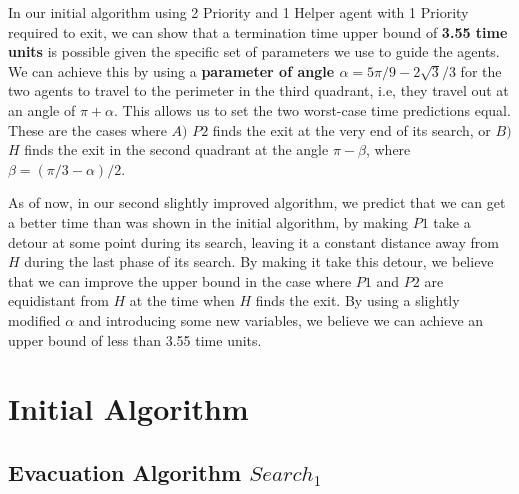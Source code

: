 \documentclass[11pt]{article}
\begin{document}
\begin{flushleft}
\hspace{\parindent} In our initial algorithm using 2 Priority and 1 Helper agent with 1 Priority required to exit, we can show that a termination time
upper bound of \textbf{3.55 time units} is possible given the specific set of parameters we use
to guide the agents. We can achieve this by using a \textbf{parameter of angle $\alpha = 5 \pi / 9 - 2\sqrt3 /3$} for the two agents to travel to the perimeter in the third quadrant, i.e, they travel out at
an angle of \textbf{$\pi + \alpha$}. This allows us to set the two worst-case time predictions equal.
These are the cases where \textbf{$A)$} $P2$ finds the exit at the very end of its search,
or \textbf{$B)$} $H$ finds the exit in the second quadrant at the angle \textbf{$\pi - \beta$},
where \textbf{$\beta = ( \pi / 3 - \alpha) / 2$}.

\hspace{\parindent} As of now, in our second slightly improved algorithm, we predict that we can get a
better time than was shown in the initial algorithm, by making $P1$ take a detour at some point during its
search, leaving it a constant distance away from $H$ during the last phase of its search. By making it
take this detour, we believe that we can improve the upper bound in the case where $P1$ and $P2$ are
equidistant from $H$ at the time when $H$ finds the exit. By using a slightly modified $\alpha$ and introducing some new variables, we believe we can achieve an upper bound of less than 3.55 time units.
\end{flushleft}




\section{Initial Algorithm}

\subsection {Evacuation Algorithm \textbf{$Search_{1}$}}
\end{document}
